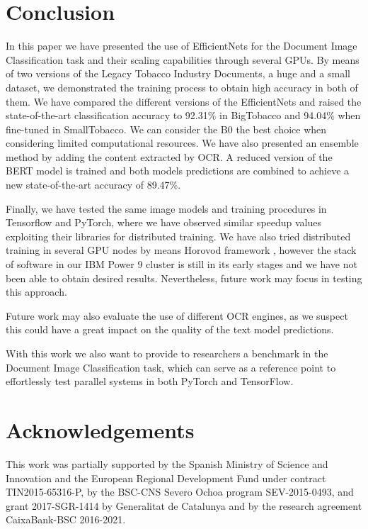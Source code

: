 \documentclass[runningheads]{llncs}
\begin{document}
\section{Conclusion}
In this paper we have presented the use of EfficientNets for the Document Image Classification task and their scaling capabilities through several GPUs. By means of two versions of the Legacy Tobacco Industry Documents, a huge and a small dataset, we demonstrated the training process to obtain high accuracy in both of them. 
We have compared the different versions of the EfficientNets and raised the state-of-the-art classification accuracy to 92.31\% in BigTobacco and 94.04\% when fine-tuned in SmallTobacco. We can consider the B0 the best choice when considering limited computational resources.
We have also presented an ensemble method by adding the content extracted by OCR. A reduced version of the BERT model is trained and both models predictions are combined to achieve a new state-of-the-art accuracy of 89.47\%.

Finally, we have tested the same image models and training procedures in Tensorflow and PyTorch, where we have observed similar speedup values exploiting their libraries for distributed training. We have also tried distributed training in several GPU nodes by means Horovod framework \cite{sergeev2018horovod}, however the stack of software in our IBM Power 9 cluster is still in its early stages and we have not been able to obtain desired results. Nevertheless, future work may focus in testing this approach.

Future work may also evaluate the use of different OCR engines, as we suspect this could have a great impact on the quality of the text model predictions.

With this work we also want to provide to researchers a benchmark in the Document Image Classification task, which can serve as a reference point to effortlessly test parallel systems in both PyTorch and TensorFlow.



\section{Acknowledgements}
This work was partially supported by the Spanish Ministry of Science and Innovation and the European Regional Development Fund under contract TIN2015-65316-P, by the BSC-CNS Severo Ochoa program
SEV-2015-0493, and grant 2017-SGR-1414 by Generalitat de Catalunya and by the research agreement CaixaBank-BSC 2016-2021.


\normalsize







\end{document}
